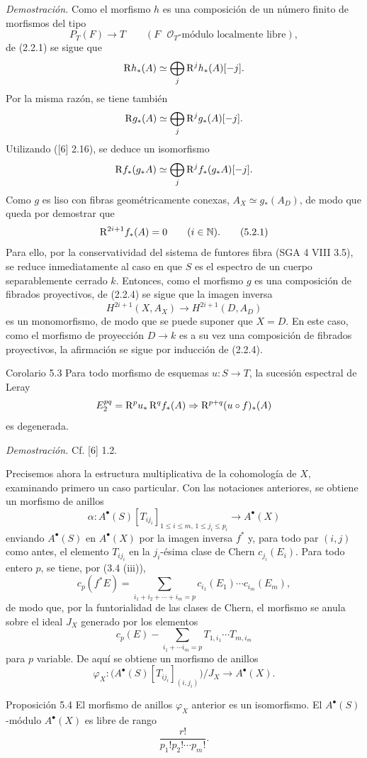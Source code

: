 \emph{Demostración.} Como el morfismo $h$ es una composición de un número finito de morfismos del tipo
\[
P_T(F)\to T\qquad (F\text{ }\mathcal O_T\text{-módulo localmente libre}),
\tag{Q}
\]
de (2.2.1) se sigue que
\[
\mathrm{R} h_*(A)\simeq\bigoplus_j \mathrm{R}^jh_*(A)[-j].
\]
Por la misma razón, se tiene también
\[
\mathrm{R} g_*(A)\simeq\bigoplus_j \mathrm{R}^jg_*(A)[-j].
\]
Utilizando ([6] 2.16), se deduce un isomorfismo
\[
\mathrm{R} f_*(g_*A)\simeq\bigoplus_j \mathrm{R}^j f_*(g_*A)[-j].
\]
Como $g$ es liso con fibras geométricamente conexas, $A_X\simeq g_*(A_D)$, de modo que queda por demostrar que
\[
\mathrm{R}^{2i+1}f_*(A)=0\qquad (i\in\mathbb N).
\tag{5.2.1}
\]
Para ello, por la conservatividad del sistema de funtores fibra (SGA 4 VIII 3.5), se reduce inmediatamente al caso en que $S$ es el espectro de un cuerpo separablemente cerrado $k$. Entonces, como el morfismo $g$ es una composición de fibrados proyectivos, de (2.2.4) se sigue que la imagen inversa
\[
H^{2i+1}(X,A_X)\to H^{2i+1}(D,A_D)
\]
es un monomorfismo, de modo que se puede suponer que $X=D$. En este caso, como el morfismo de proyección $D\to k$ es a su vez una composición de fibrados proyectivos, la afirmación se sigue por inducción de (2.2.4).

\begin{statement}{Corolario 5.3}
Para todo morfismo de esquemas $u:S\to T$, la sucesión espectral de Leray
\[
E_2^{pq}=\mathrm{R}^p u_*\,\mathrm{R}^q f_*(A)\Rightarrow \mathrm{R}^{p+q}(u\circ f)_*(A)
\]
es degenerada.
\end{statement}

\emph{Demostración.} Cf. [6] 1.2.

Precisemos ahora la estructura multiplicativa de la cohomología de $X$, examinando primero un caso particular. Con las notaciones anteriores, se obtiene un morfismo de anillos
\[
\alpha:A^\bullet(S)[T_{ij_i}]_{1\le i\le m,\,1\le j_i\le p_i}\to A^\bullet(X)
\]
enviando $A^\bullet(S)$ en $A^\bullet(X)$ por la imagen inversa $f^*$ y, para todo par $(i,j)$ como antes, el elemento $T_{ij_i}$ en la $j_i$-ésima clase de Chern $c_{j_i}(E_i)$. Para todo entero $p$, se tiene, por (3.4 (iii)),
\[
c_p(f^*E)=\sum_{i_1+i_2+\cdots+i_m=p}c_{i_1}(E_1)\cdots c_{i_m}(E_m),
\]
de modo que, por la funtorialidad de las clases de Chern, el morfismo se anula sobre el ideal $J_X$ generado por los elementos
\[
c_p(E)-\sum_{i_1+\cdots i_m=p}T_{1,i_1}\cdots T_{m,i_m}
\]
para $p$ variable. De aquí se obtiene un morfismo de anillos
\[
\varphi_X:\bigl(A^\bullet(S)[T_{ij_i}]_{(i,j_i)}\bigr)/J_X\to A^\bullet(X).
\]

\begin{statement}{Proposición 5.4}
El morfismo de anillos $\varphi_X$ anterior es un isomorfismo. El $A^\bullet(S)$-módulo $A^\bullet(X)$ es libre de rango
\[
\frac{r!}{p_1!p_2!\cdots p_m!}.
\]
\end{statement}
